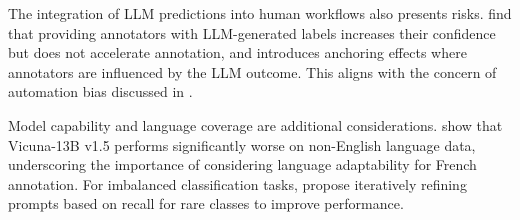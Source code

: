 The integration of LLM predictions into human workflows also presents risks. \textcite{DBLP:conf/acl/SchroederRK25} find that providing annotators with LLM-generated labels increases their confidence but does not accelerate annotation, and introduces anchoring effects where annotators are influenced by the LLM outcome. This aligns with the concern of automation bias discussed in \textcite{DBLP:journals/corr/abs-2503-06778}.

Model capability and language coverage are additional considerations. \textcite{pmlr-v239-mohta23a} show that Vicuna-13B v1.5 performs significantly worse on non-English language data, underscoring the importance of considering language adaptability for French annotation. For imbalanced classification tasks, \textcite{chen2025human} propose iteratively refining prompts based on recall for rare classes to improve performance.








